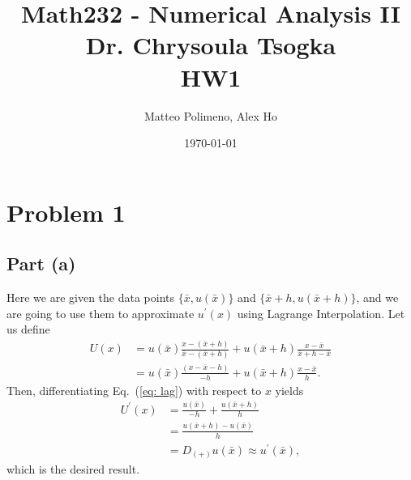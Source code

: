 \documentclass[aps,prl,preprint,groupedaddress]{revtex4-1}
\newcommand{\xbar}{\bar{x}}
\begin{document}
	\author{Matteo Polimeno, Alex Ho}
	\date{\today}
	\title{Math232 - Numerical Analysis II\\ Dr. Chrysoula Tsogka\\
		HW1}
\maketitle
\section{Problem 1}
\subsection{Part (a)}
Here we are given the data points $\{\bar{x},u(\bar{x})\}$ and $\{\bar{x}+h,u(\bar{x}+h)\}$, and we are going to use them to approximate $u^{\prime}(x)$ using Lagrange Interpolation. Let us define
\begin{align}\label{eq: lag}
U(x) &= u(\xbar)\frac{x-(\xbar+h)}{\xbar-(\xbar+h)}+u(\xbar+h)\frac{x-\xbar}{\xbar+h-\xbar}\nonumber\\
&= u(\xbar)\frac{(x-\xbar-h)}{-h}+u(\xbar+h)\frac{x-\xbar}{h}.
\end{align}
Then, differentiating Eq.~(\ref{eq: lag}) with respect to $x$ yields
\begin{align}\label{eq: dp}
U^{\prime}(x) &= \frac{u(\xbar)}{-h} + \frac{u(\xbar+h)}{h}\nonumber\\
&= \frac{u(\xbar+h)-u(\xbar)}{h}\nonumber\\
&= D_{(+)}u(\xbar)\approx{u^{\prime}(\xbar)},
\end{align}
which is the desired result.
\end{document}
